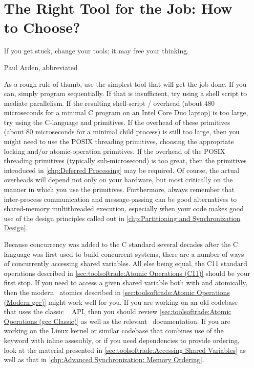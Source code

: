 \section{The Right Tool for the Job:
					How to Choose?}
\label{sec:toolsoftrade:The Right Tool for the Job: How to Choose?}
%
\epigraph{If you get stuck, change your tools; it may free your thinking.}
	 {Paul Arden, abbreviated}

As a rough rule of thumb, use the simplest tool that will get the job done.
If you can, simply program sequentially.
If that is insufficient, try using a shell script to mediate parallelism.
If the resulting shell-script / overhead
(about 480 microseconds for a minimal C program on an Intel Core Duo
laptop) is too
large, try using the C-language  and  primitives.
If the overhead of these primitives (about 80 microseconds for a minimal
child process) is still too large, then you
might need to use the POSIX threading primitives, choosing the appropriate
locking and/or atomic-operation primitives.
If the overhead of the POSIX threading primitives (typically sub-microsecond)
is too great, then the primitives introduced in
\cref{chp:Deferred Processing} may be required.
Of course, the actual overheads will depend not only on your hardware,
but most critically on the manner in which you use the primitives.
Furthermore, always remember that inter-process communication and
message-passing can be good alternatives to shared-memory multithreaded
execution, especially when your code makes good use of the design
principles called out in
\cref{chp:Partitioning and Synchronization Design}.

\QuickQuizEnd

Because concurrency was added to the C standard several decades after
the C language was first used to build concurrent systems, there are
a number of ways of concurrently accessing shared variables.
All else being equal, the C11 standard operations described in
\cref{sec:toolsoftrade:Atomic Operations (C11)}
should be your first stop.
If you need to access a given shared variable both with 
and atomically, then the modern \GCC\ atomics described in
\cref{sec:toolsoftrade:Atomic Operations (Modern gcc)}
might work well for you.
If you are working on an old codebase that uses the classic \GCC\ 
API, then you should review
\cref{sec:toolsoftrade:Atomic Operations (gcc Classic)}
as well as the relevant \GCC\ documentation.
If you are working on the Linux kernel or similar codebase that
combines use of the  keyword with inline assembly,
or if you need dependencies to provide ordering, look at the material
presented in \cref{sec:toolsoftrade:Accessing Shared Variables}
as well as that in
\cref{chp:Advanced Synchronization: Memory Ordering}.

